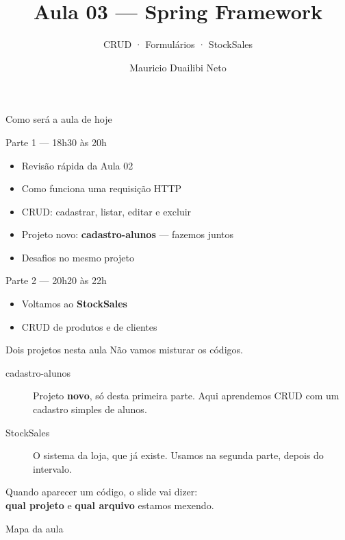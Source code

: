 \documentclass[aspectratio=169,11pt]{beamer}
\title{Aula 03 --- Spring Framework}
\subtitle{CRUD · Formulários · StockSales}
\author{Mauricio Duailibi Neto}
\institute{Turma Java Entra21}
\date{}
\begin{document}
\begin{frame}
  \titlepage
\end{frame}

\begin{frame}{Como será a aula de hoje}
  \begin{block}{Parte 1 --- 18h30 às 20h}
    \begin{itemize}
      \item Revisão rápida da Aula 02
      \item Como funciona uma requisição HTTP
      \item CRUD: cadastrar, listar, editar e excluir
      \item Projeto novo: \textbf{cadastro-alunos} --- fazemos juntos
      \item Desafios no mesmo projeto
    \end{itemize}
  \end{block}

  \vspace{0.4em}
  \begin{block}{Parte 2 --- 20h20 às 22h}
    \begin{itemize}
      \item Voltamos ao \textbf{StockSales}
      \item CRUD de produtos e de clientes
    \end{itemize}
  \end{block}
\end{frame}

\begin{frame}{Dois projetos nesta aula}
  Não vamos misturar os códigos.

  \vspace{0.6em}
  \begin{description}
    \item[cadastro-alunos] Projeto \textbf{novo}, só desta primeira parte.
      Aqui aprendemos CRUD com um cadastro simples de alunos.
    \item[StockSales] O sistema da loja, que já existe.
      Usamos na segunda parte, depois do intervalo.
  \end{description}

  \vspace{0.6em}
  Quando aparecer um código, o slide vai dizer:\\
  \textbf{qual projeto} e \textbf{qual arquivo} estamos mexendo.
\end{frame}

\begin{frame}{Mapa da aula}
  \tableofcontents
\end{frame}
\end{document}
